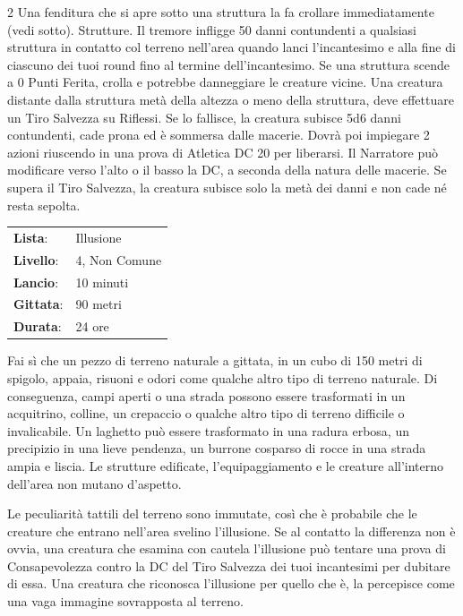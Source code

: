 \begin{multicols}{2}
Una fenditura che si apre sotto una struttura la fa crollare immediatamente (vedi sotto). Strutture. Il tremore infligge 50 danni contundenti a qualsiasi struttura in contatto col terreno nell'area quando lanci l'incantesimo e alla fine di ciascuno dei tuoi round fino al termine dell'incantesimo. Se una struttura scende a 0 Punti Ferita, crolla e potrebbe danneggiare le creature vicine. Una creatura distante dalla struttura metà della altezza o meno della struttura, deve effettuare un Tiro Salvezza su Riflessi. Se lo fallisce, la creatura subisce 5d6 danni contundenti, cade prona ed è sommersa dalle macerie. Dovrà poi impiegare 2 azioni riuscendo in una prova di Atletica DC 20 per liberarsi. Il Narratore può modificare verso l'alto o il basso la DC, a seconda della natura delle macerie. Se supera il Tiro Salvezza, la creatura subisce solo la metà dei danni e non cade né resta sepolta.

\noindent\begin{tabularx}{\linewidth}{p{1.9cm}X}
	\rowcolor{gray!20}\textbf{Lista}: & Illusione \\
	\textbf{Livello}: & 4, Non Comune \\
	\rowcolor{gray!20}\textbf{Lancio}: & 10 minuti \\
	\textbf{Gittata}: & 90 metri \\
	\rowcolor{gray!20}\textbf{Durata}: & 24 ore \\
\end{tabularx}\smallskip

Fai sì che un pezzo di terreno naturale a gittata, in un cubo di 150 metri di spigolo, appaia, risuoni e odori come qualche altro tipo di terreno naturale. Di conseguenza, campi aperti o una strada possono essere trasformati in un acquitrino, colline, un crepaccio o qualche altro tipo di terreno difficile o invalicabile. Un laghetto può essere trasformato in una radura erbosa, un precipizio in una lieve pendenza, un burrone cosparso di rocce in una strada ampia e liscia. Le strutture edificate, l'equipaggiamento e le creature all'interno dell'area non mutano d'aspetto.

Le peculiarità tattili del terreno sono immutate, così che è probabile che le creature che entrano nell'area svelino l'illusione. Se al contatto la differenza non è ovvia, una creatura che esamina con cautela l'illusione può tentare una prova di Consapevolezza contro la DC del Tiro Salvezza dei tuoi incantesimi per dubitare di essa. Una creatura che riconosca l'illusione per quello che è, la percepisce come una vaga immagine sovrapposta al terreno.


\end{multicols}
